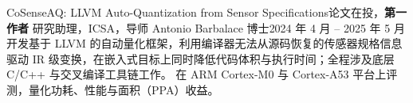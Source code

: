     \resumeSubheading
      {CoSenseAQ: LLVM Auto-Quantization from Sensor Specifications}{论文在投，\textbf{第一作者}}
      {研究助理，ICSA，导师 Antonio Barbalace 博士}{2024 年 4 月 -- 2025 年 5 月}
      \resumeItemListStart
          {开发基于 LLVM 的自动量化框架，利用编译器无法从源码恢复的传感器规格信息驱动 IR 级变换，在嵌入式目标上同时降低代码体积与执行时间；全程涉及底层 C/C++ 与交叉编译工具链工作。}
          {在 ARM Cortex-M0 与 Cortex-A53 平台上评测，量化功耗、性能与面积（PPA）收益。}
      \resumeItemListEnd
